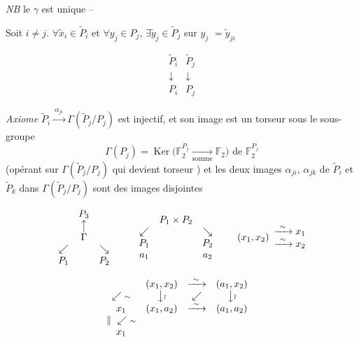 \documentclass[11pt,a4paper]{article}
\begin{document}
\emph{NB} le $\gamma$ est unique -- 


Soit $i \neq j$.  $\forall \tilde x_i \in \tilde P_i$ et $\forall y_j \in P_j$,
$\exists \tilde y_j \in \tilde P_j$ sur $y_j$  $= \tilde y_{ji}$

\[
\begin{array}{cc}
\tilde P_i & \tilde P_j \\
\downarrow & \downarrow \\
P_i & P_j
\end{array}
\]

\emph{Axiome} \quad $\tilde P_i \xrightarrow{\ \alpha_{ji}\ } \Gamma(\tilde P_j / P_j)$ est injectif,
et  son image est un torseur sous le sous-groupe
\[
\Gamma(P_j) = \operatorname{Ker}\bigl(\mathbb{F}_2^{P_j} \xrightarrow[\text{somme}]{} \mathbb{F}_2\bigr)
\text{ de } \mathbb{F}_2^{P_j}
\]
(opérant sur $\Gamma(\tilde P_j / P_j)$ qui devient  torseur
) et les deux images $\alpha_{ji}$, $\alpha_{jk}$
\struck{\ill{}} de $\tilde P_i$ et $\tilde P_k$ dans $\Gamma(\tilde P_j / P_j)$
sont des images disjointes

\[
\begin{array}{ccc}
& P_3 & \\
& \big\uparrow & \\
& \Gamma & \\
\swarrow & & \searrow \\
P_1 & & P_2
\end{array}
\qquad
\begin{array}{ccc}
& P_1 \times P_2 & \\
\swarrow & & \searrow \\
P_1 & & P_2 \\
a_1 & & a_2
\end{array}
\qquad
(x_1, x_2)
\begin{array}{l}
\xrightarrow{\ \sim\ } x_1 \\
\xrightarrow{\ \sim\ } x_2
\end{array}
\]

\[
\begin{array}{ccccc}
& (x_1, x_2) & \xrightarrow{\ \sim\ } & (a_1, x_2) & \\
\swarrow{\scriptstyle \sim} & \big\downarrow{\scriptstyle \wr} & \swarrow & \big\downarrow{\scriptstyle \wr} & \\
x_1 & (x_1, a_2) & \xrightarrow{\ \sim\ } & (a_1, a_2) & \\
\Vert \ \swarrow{\scriptstyle \sim} & & & & \\
x_1 & & & &
\end{array}
\]
\end{document}

